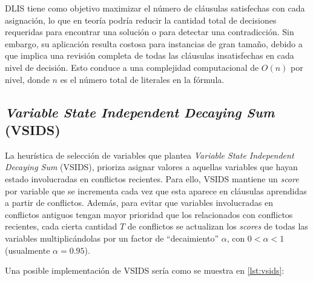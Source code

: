 

DLIS tiene como objetivo maximizar el número de cláusulas satisfechas con cada asignación, lo que en teoría podría reducir la cantidad total de decisiones requeridas para encontrar una solución o para detectar una contradicción. Sin embargo, su aplicación resulta costosa para instancias de gran tamaño, debido a que implica una revisión completa de todas las cláusulas insatisfechas en cada nivel de decisión. Esto conduce a una complejidad computacional de $O(n)$ por nivel, donde $n$ es el número total de literales en la fórmula.


\subsection{\textit{Variable State Independent Decaying Sum} (VSIDS)}
\label{subsec:vsids}

La heurística de selecci\'on de variables que plantea \textit{Variable State Independent Decaying Sum} (VSIDS), prioriza asignar valores a aquellas variables que hayan estado involucradas en conflictos recientes. Para ello, VSIDS mantiene un \textit{score} por variable que se incrementa cada vez que esta aparece en cláusulas aprendidas a partir de conflictos. Además, para evitar que variables involucradas en conflictos antiguos tengan mayor prioridad que los relacionados con conflictos recientes, cada cierta cantidad \( T \) de conflictos se actualizan los \textit{scores} de todas las variables multiplicándolas por un factor de ``decaimiento'' \(\alpha\), con \(0 < \alpha < 1\) (usualmente \(\alpha = 0.95\)). 

Una posible implementaci\'on de VSIDS ser\'ia como se muestra en \ref{lst:vsids}:


